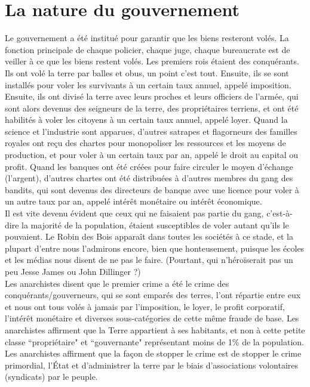 \section*{La nature du gouvernement}

Le gouvernement a été institué pour garantir que les biens resteront volés. La fonction principale de chaque policier, chaque juge, chaque bureaucrate est de veiller à ce que les biens restent volés.
Les premiers rois étaient des conquérants. Ils ont volé la terre par balles et obus, un point c'est tout. Ensuite, ils se sont installés pour voler les survivants à un certain taux annuel, appelé imposition. Ensuite, ils ont divisé la terre avec leurs proches et leurs officiers de l'armée, qui sont alors devenus des seigneurs de la terre, des propriétaires terriens, et ont été habilités à voler les citoyens à un certain taux annuel, appelé loyer. Quand la science et l'industrie sont apparues, d'autres satrapes et flagorneurs des familles royales ont reçu des chartes pour monopoliser les ressources et les moyens de production, et pour voler à un certain taux par an, appelé le droit au capital ou profit. Quand les banques ont été créées pour faire circuler le moyen d'échange (l'argent), d'autres chartes ont été distribuées à d'autres membres du gang des bandits, qui sont devenus des directeurs de banque avec une licence pour voler à un autre taux par an, appelé intérêt monétaire ou intérêt économique.\\
Il est vite devenu évident que ceux qui ne faisaient pas partie du gang, c'est-à-dire la majorité de la population, étaient susceptibles de voler autant qu'ils le pouvaient. Le Robin des Bois apparaît dans toutes les sociétés à ce stade, et la plupart d'entre nous l'admirons encore, bien que honteusement, puisque les écoles et les médias nous disent de ne pas le faire. (Pourtant, qui n'héroïserait pas un peu Jesse James ou John Dillinger ?)\\
Les anarchistes disent que le premier crime a été le crime des conquérants/gouverneurs, qui se sont emparés des terres, l'ont répartie entre eux et nous ont tous volés à jamais par l'imposition, le loyer, le profit corporatif, l'intérêt monétaire et diverses sous-catégories de cette même fraude de base. Les anarchistes affirment que la Terre appartient à ses habitants, et non à cette petite classe ``propriétaire" et ``gouvernante" représentant moins de 1\%  de la population.\\
Les anarchistes affirment que la façon de stopper le crime est de stopper le crime primordial, l'État et d'administrer la terre par le biais d'associations volontaires (syndicats) par le peuple.\\
